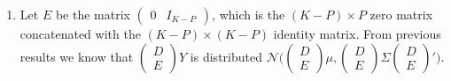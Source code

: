 \documentclass{article}[12pt]
\begin{document}
\begin{enumerate}
	\item Let $E$ be the matrix $\begin{pmatrix} 0 & I_{K-P} \end{pmatrix}$, which is the $(K-P) \times P$ zero matrix concatenated with the $(K-P) \times (K-P)$ identity matrix. From previous results we know that $\begin{pmatrix} D \\ E \end{pmatrix} Y$ is distributed $\mathscr{N} \bigg( \begin{pmatrix} D \\ E \end{pmatrix} \mu, \begin{pmatrix} D \\ E \end{pmatrix} \Sigma \begin{pmatrix} D \\ E \end{pmatrix}' \bigg)$.


\end{enumerate}
\end{document}
